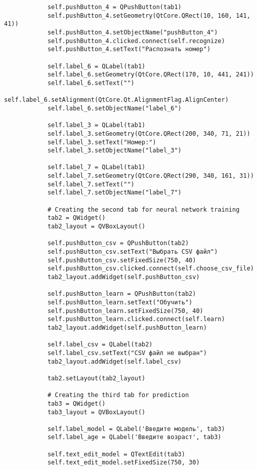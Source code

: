 \begin{lstlisting}
            self.pushButton_4 = QPushButton(tab1)
            self.pushButton_4.setGeometry(QtCore.QRect(10, 160, 141, 41))
            self.pushButton_4.setObjectName("pushButton_4")
            self.pushButton_4.clicked.connect(self.recognize)
            self.pushButton_4.setText("Распознать номер")

            self.label_6 = QLabel(tab1)
            self.label_6.setGeometry(QtCore.QRect(170, 10, 441, 241))
            self.label_6.setText("")
            self.label_6.setAlignment(QtCore.Qt.AlignmentFlag.AlignCenter)
            self.label_6.setObjectName("label_6")

            self.label_3 = QLabel(tab1)
            self.label_3.setGeometry(QtCore.QRect(200, 340, 71, 21))
            self.label_3.setText("Номер:")
            self.label_3.setObjectName("label_3")

            self.label_7 = QLabel(tab1)
            self.label_7.setGeometry(QtCore.QRect(290, 340, 161, 31))
            self.label_7.setText("")
            self.label_7.setObjectName("label_7")

            # Creating the second tab for neural network training
            tab2 = QWidget()
            tab2_layout = QVBoxLayout()

            self.pushButton_csv = QPushButton(tab2)
            self.pushButton_csv.setText("Выбрать CSV файл")
            self.pushButton_csv.setFixedSize(750, 40)
            self.pushButton_csv.clicked.connect(self.choose_csv_file)
            tab2_layout.addWidget(self.pushButton_csv)

            self.pushButton_learn = QPushButton(tab2)
            self.pushButton_learn.setText("Обучить")
            self.pushButton_learn.setFixedSize(750, 40)
            self.pushButton_learn.clicked.connect(self.learn)
            tab2_layout.addWidget(self.pushButton_learn)

            self.label_csv = QLabel(tab2)
            self.label_csv.setText("CSV файл не выбран")
            tab2_layout.addWidget(self.label_csv)

            tab2.setLayout(tab2_layout)

            # Creating the third tab for prediction
            tab3 = QWidget()
            tab3_layout = QVBoxLayout()

            self.label_model = QLabel('Введите модель', tab3)
            self.label_age = QLabel('Введите возраст', tab3)

            self.text_edit_model = QTextEdit(tab3)
            self.text_edit_model.setFixedSize(750, 30)
            

\end{lstlisting}
